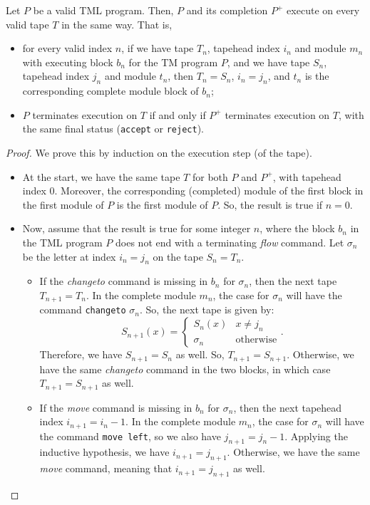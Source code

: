 \begin{appendices}
\begin{theorem} \label{thm:complete_TM}
    Let $P$ be a valid TML program. Then, $P$ and its completion $P^+$ execute on every valid tape $T$ in the same way. That is,
    \begin{itemize}
        \item for every valid index $n$, if we have tape $T_n$, tapehead index $i_n$ and module $m_n$ with executing block $b_n$ for the TM program $P$, and we have tape $S_n$, tapehead index $j_n$ and module $t_n$, then $T_n = S_n$, $i_n = j_n$, and $t_n$ is the corresponding complete module block of $b_n$;
        \item $P$ terminates execution on $T$ if and only if $P^+$ terminates execution on $T$, with the same final status (\texttt{accept} or \texttt{reject}).
    \end{itemize}
\end{theorem}
\begin{proof}
    We prove this by induction on the execution step (of the tape). 
    \begin{itemize}
        \item At the start, we have the same tape $T$ for both $P$ and $P^+$, with tapehead index 0. Moreover, the corresponding (completed) module of the first block in the first module of $P$ is the first module of $P$. So, the result is true if $n = 0$. 
        \item Now, assume that the result is true for some integer $n$, where the block $b_n$ in the TML program $P$ does not end with a terminating \textit{flow} command. Let $\sigma_n$ be the letter at index $i_n = j_n$ on the tape $S_n = T_n$.
        \begin{itemize}
            \item If the \textit{changeto} command is missing in $b_n$ for $\sigma_n$, then the next tape $T_{n+1} = T_n$. In the complete module $m_n$, the case for $\sigma_n$ will have the command \texttt{changeto} $\sigma_n$. So, the next tape is given by:
            \[S_{n+1}(x) = \begin{cases}
                S_n(x) & x \neq j_n \\
                \sigma_n & \text{otherwise}
            \end{cases}.\]
            Therefore, we have $S_{n+1} = S_n$ as well. So, $T_{n+1} = S_{n+1}$. Otherwise, we have the same \textit{changeto} command in the two blocks, in which case $T_{n+1} = S_{n+1}$ as well.
            
            \item If the \textit{move} command is missing in $b_n$ for $\sigma_n$, then the next tapehead index $i_{n+1} = i_n - 1$. In the complete module $m_n$, the case for $\sigma_n$ will have the command \texttt{move left}, so we also have $j_{n+1} = j_n - 1$. Applying the inductive hypothesis, we have $i_{n+1} = j_{n+1}$. Otherwise, we have the same \textit{move} command, meaning that $i_{n+1} = j_{n+1}$ as well.
            

\end{itemize}
\end{itemize}
\end{proof}
\end{appendices}
